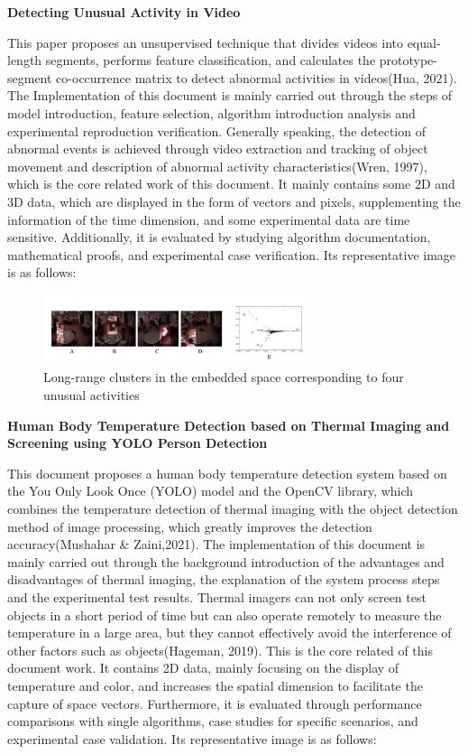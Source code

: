 \documentclass[12pt]{article}
\begin{document}
\noindent \textbf{Detecting Unusual Activity in Video}

\noindent This paper proposes an unsupervised technique that divides videos into equal-length segments, performs feature classification, and calculates the prototype-segment co-occurrence matrix to detect abnormal activities in videos(Hua, 2021). The Implementation of this document is mainly carried out through the steps of model introduction, feature selection, algorithm introduction analysis and experimental reproduction verification. Generally speaking, the detection of abnormal events is achieved through video extraction and tracking of object movement and description of abnormal activity characteristics(Wren, 1997), which is the core related work of this document. It mainly contains some 2D and 3D data, which are displayed in the form of vectors and pixels, supplementing the information of the time dimension, and some experimental data are time sensitive. Additionally, it is evaluated by studying algorithm documentation, mathematical proofs, and experimental case verification. Its representative image is as follows:

\begin{figure}[H]
\centering
\includegraphics[width=0.7\textwidth]{Paper6.pic.jpg}
\caption{Long-range clusters in the embedded space corresponding to four unusual activities} 
\end{figure}

\noindent \textbf{Human Body Temperature Detection based on Thermal Imaging and Screening using YOLO Person Detection}

\noindent This document proposes a human body temperature detection system based on the You Only Look Once (YOLO) model and the OpenCV library, which combines the temperature detection of thermal imaging with the object detection method of image processing, which greatly improves the detection accuracy(Mushahar \& Zaini,2021). The implementation of this document is mainly carried out through the background introduction of the advantages and disadvantages of thermal imaging, the explanation of the system process steps and the experimental test results. Thermal imagers can not only screen test objects in a short period of time but can also operate remotely to measure the temperature in a large area, but they cannot effectively avoid the interference of other factors such as objects(Hageman, 2019). This is the core related of this document work. It contains 2D data, mainly focusing on the display of temperature and color, and increases the spatial dimension to facilitate the capture of space vectors. Furthermore, it is evaluated through performance comparisons with single algorithms, case studies for specific scenarios, and experimental case validation. Its representative image is as follows:
\end{document}
